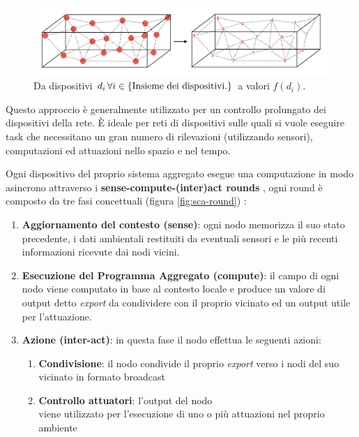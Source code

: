 \documentclass[12pt,a4paper,openright,twoside]{book}
\begin{document}
\begin{figure}
    \centering
    \includegraphics[width=.9\linewidth]{figures/device-to-value.pdf}
    \caption{Da dispositivi $d_i \thinspace \forall i \in {\text{\{Insieme dei dispositivi.\}}}$ a valori $f(d_i)$.}
    \label{fig:device-to-value}
\end{figure}

Questo approccio è generalmente utilizzato per un controllo prolungato dei dispositivi della rete. È ideale per reti di dispositivi sulle quali si vuole eseguire task che necessitano un gran numero di rilevazioni (utilizzando sensori), computazioni ed attuazioni nello spazio e nel tempo.

Ogni dispositivo del proprio sistema aggregato esegue una computazione in modo asincrono attraverso i \textbf{sense-compute-(inter)act rounds}\label{sec:sense-compute-interact} \cite{Macroswarm}, ogni round è composto da tre fasi concettuali (figura \ref{fig:sca-round}) \cite{Casadei2021-2}:

\begin{enumerate}
    \item \textbf{Aggiornamento del contesto (sense)}: ogni nodo memorizza il suo stato precedente, i dati ambientali restituiti da eventuali sensori e le più recenti informazioni ricevute dai nodi vicini.
    \item \textbf{Esecuzione del Programma Aggregato (compute)}: il campo di ogni nodo viene computato in base al contesto locale e produce un valore di output detto \textit{export} da condividere con il proprio vicinato ed un output utile per l'attuazione.
    \item \textbf{Azione (inter-act)}: in questa fase il nodo effettua le seguenti azioni:
    \begin{enumerate}
        \item \textbf{Condivisione}: il nodo condivide il proprio \textit{export} verso i nodi del suo vicinato in formato broadcast
        \item \textbf{Controllo attuatori}: l'output del nodo \\ viene 
        utilizzato per l'esecuzione di uno o più attuazioni nel proprio ambiente
    \end{enumerate}
\end{enumerate}
\end{document}
